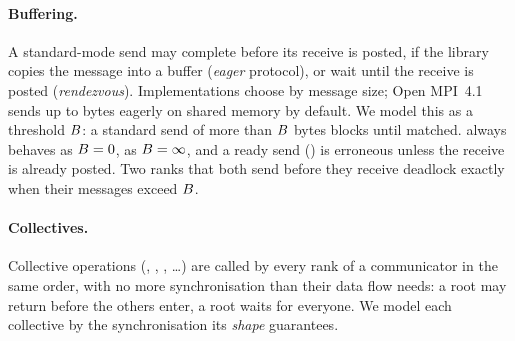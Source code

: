 \paragraph{Buffering.} A standard-mode send may complete before its receive is posted,
if the library copies the message into a buffer (\emph{eager} protocol), or wait until the
receive is posted (\emph{rendezvous}). Implementations choose by message size; Open MPI~4.1
sends up to \BimplOMPI bytes eagerly on shared memory by default. We model this as a
threshold $B$: a standard send of more than $B$ bytes blocks until matched.
 always behaves as $B=0$,  as $B=\infty$, and a ready send
() is erroneous unless the receive is already posted. Two ranks that both send
before they receive deadlock exactly when their messages exceed $B$.

\paragraph{Collectives.} Collective operations (,
, , \dots) are called by every rank of a communicator in
the same order, with no more synchronisation than their data flow needs: a 
root may return before the others enter, a  root waits for everyone. We model
each collective by the synchronisation its \emph{shape} guarantees.
